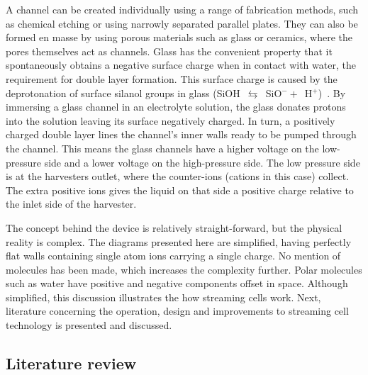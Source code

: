 
  A channel can be created individually using a range of fabrication methods, such as chemical etching or using narrowly separated parallel plates.
  They can also be formed en masse by using porous materials such as glass or ceramics, where the pores themselves act as channels.
  Glass has the convenient property that it spontaneously obtains a negative surface charge when in contact with water, the requirement for double layer formation.
  This surface charge is caused by the deprotonation of surface silanol groups in glass (SiOH~$\leftrightarrows$~SiO$^{-}+$~H$^{+}$)~\cite{Kirby2004}.
  By immersing a glass channel in an electrolyte solution, the glass donates protons into the solution leaving its surface negatively charged.
  In turn, a positively charged double layer lines the channel's inner walls ready to be pumped through the channel.
  This means the glass channels have a higher voltage on the low-pressure side and a lower voltage on the high-pressure side.
  The low pressure side is at the harvesters outlet, where the counter-ions (cations in this case) collect.
  The extra positive ions gives the liquid on that side a positive charge relative to the inlet side of the harvester.

  The concept behind the device is relatively straight-forward, but the physical reality is complex.
  The diagrams presented here are simplified, having perfectly flat walls containing single atom ions carrying a single charge.
  No mention of molecules has been made, which increases the complexity further.
  Polar molecules such as water have positive and negative components offset in space.
  Although simplified, this discussion illustrates the how streaming cells work.
  Next, literature concerning the operation, design and improvements to streaming cell technology is presented and discussed.


  \subsection{Literature review}
    \label{sub:background_streamingCells_literatureReview}


